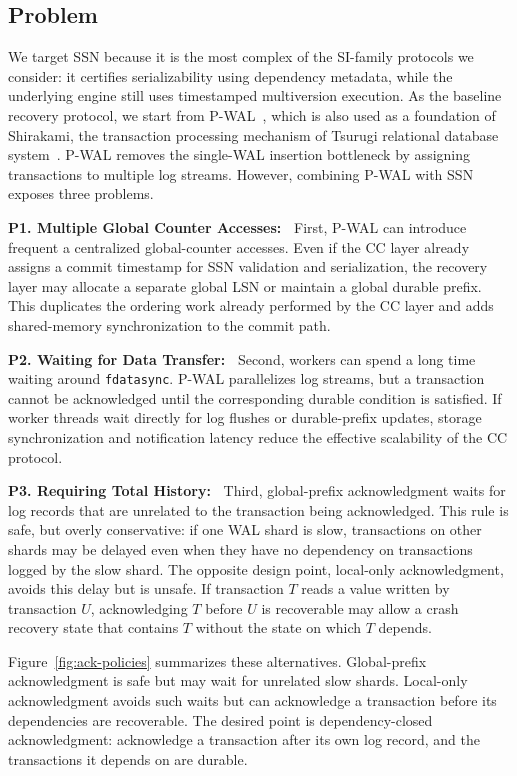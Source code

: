 \subsection{Problem}
\label{sec:introduction-problem}

We target SSN because it is the most complex of the SI-family protocols we consider: it certifies serializability using dependency metadata, while the underlying engine still uses timestamped multiversion execution.  As the baseline recovery protocol, we start from P-WAL~\cite{kamiya2017pwal}, which is also used as a foundation of Shirakami, the transaction processing mechanism of Tsurugi relational database system~\cite{shirakami}. 
%
P-WAL removes the single-WAL insertion bottleneck by assigning transactions to
multiple log streams.  However, combining P-WAL with SSN exposes three
problems.

\textbf{P1. Multiple Global Counter Accesses:~} First, P-WAL can introduce frequent a centralized global-counter accesses.  Even if the CC layer already assigns a commit timestamp for SSN validation and serialization, the recovery layer may allocate a separate global LSN or maintain a global durable prefix.  This duplicates the ordering work already performed by the CC layer
and adds shared-memory synchronization to the commit path.

\textbf{P2. Waiting for Data Transfer:~} Second, workers can spend a long time waiting around \texttt{fdatasync}.  P-WAL
parallelizes log streams, but a transaction cannot be acknowledged until the corresponding durable condition is satisfied.  If worker threads wait directly
for log flushes or durable-prefix updates, storage synchronization and
notification latency reduce the effective scalability of the CC protocol.

\textbf{P3. Requiring Total History:~} Third, global-prefix acknowledgment waits for log records that are unrelated to
the transaction being acknowledged.  This rule is safe, but overly conservative: if one WAL shard is slow, transactions on other shards may be delayed even when they have no dependency on transactions logged by the slow shard.  The opposite
design point, local-only acknowledgment, avoids this delay but is unsafe.  If transaction $T$ reads a value written by transaction $U$, acknowledging $T$ before $U$ is recoverable may allow a crash recovery state that contains $T$
without the state on which $T$ depends.

Figure~\ref{fig:ack-policies} summarizes these alternatives.  Global-prefix acknowledgment is safe but may wait for unrelated slow shards.  Local-only acknowledgment avoids such waits but can acknowledge a transaction before its dependencies are recoverable.  The desired point is dependency-closed acknowledgment: acknowledge a transaction after its own log record, and the transactions it depends on are durable.

